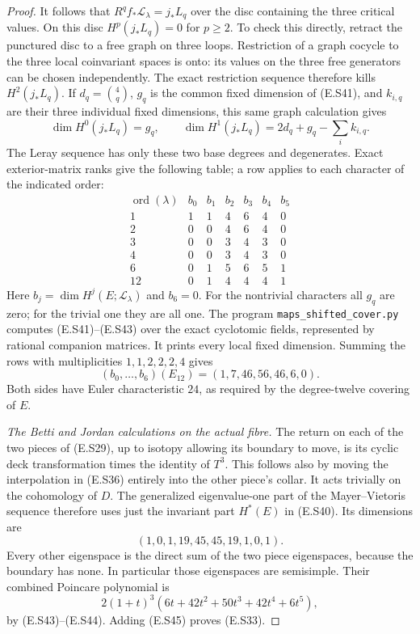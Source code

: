\begin{proof}
It follows that $R^q f_*\mathcal L_\lambda=j_*L_q$ over
the disc containing the three critical values. On this
disc $H^p(j_*L_q)=0$ for $p\geq2$. To check this directly,
retract the punctured disc to a free graph on three loops.
Restriction of a graph cocycle to the three local
coinvariant spaces is onto: its values on the three free
generators can be chosen independently. The exact
restriction sequence therefore kills $H^2(j_*L_q)$.
If $d_q=\binom4q$, $g_q$ is the common fixed dimension of
(E.S41), and $k_{i,q}$ are their three individual fixed
dimensions, this same graph calculation gives
\[
 \dim H^0(j_*L_q)=g_q,\qquad
 \dim H^1(j_*L_q)=2d_q+g_q-\sum_i k_{i,q}.
 \tag{E.S42}
\]
The Leray sequence has only these two base degrees and
degenerates. Exact exterior-matrix ranks give the following
table; a row applies to each character of the indicated
order:
\[
 \begin{array}{c|rrrrrr}
 \operatorname{ord}(\lambda)&b_0&b_1&b_2&b_3&b_4&b_5\\ \hline
 1 &1&1&4&6&4&0\\
 2 &0&0&4&6&4&0\\
 3 &0&0&3&4&3&0\\
 4 &0&0&3&4&3&0\\
 6 &0&1&5&6&5&1\\
 12&0&1&4&4&4&1
 \end{array}
 \tag{E.S43}
\]
Here $b_j=\dim H^j(E;\mathcal L_\lambda)$ and $b_6=0$.
For the nontrivial characters all $g_q$ are zero; for the
trivial one they are all one. The program
\texttt{maps\_shifted\_cover.py} computes (E.S41)--(E.S43)
over the exact cyclotomic fields, represented by rational
companion matrices. It prints every local fixed dimension.
Summing the rows with multiplicities $1,1,2,2,2,4$ gives
\[
             (b_0,\ldots,b_6)(E_{12})=(1,7,46,56,46,6,0).
 \tag{E.S44}
\]
Both sides have Euler characteristic $24$, as required by
the degree-twelve covering of $E$.

\emph{The Betti and Jordan calculations on the actual fibre.}
The return on each of the two pieces of (E.S29), up to
isotopy allowing its boundary to move, is its cyclic deck
transformation times the identity of $T^3$. This follows
also by moving the interpolation in (E.S36) entirely into
the other piece's collar. It acts trivially on the
cohomology of $D$. The generalized eigenvalue-one part of
the Mayer--Vietoris sequence therefore uses just the
invariant part $H^*(E)$ in (E.S40). Its dimensions are
\[
       (1,0,1,19,45,45,19,1,0,1).
 \tag{E.S45}
\]
Every other eigenspace is the direct sum of the two piece
eigenspaces, because the boundary has none. In particular
those eigenspaces are semisimple. Their combined Poincare
polynomial is
\[
     2(1+t)^3(6t+42t^2+50t^3+42t^4+6t^5),
 \tag{E.S46}
\]
by (E.S43)--(E.S44). Adding (E.S45) proves (E.S33).


\end{proof}

